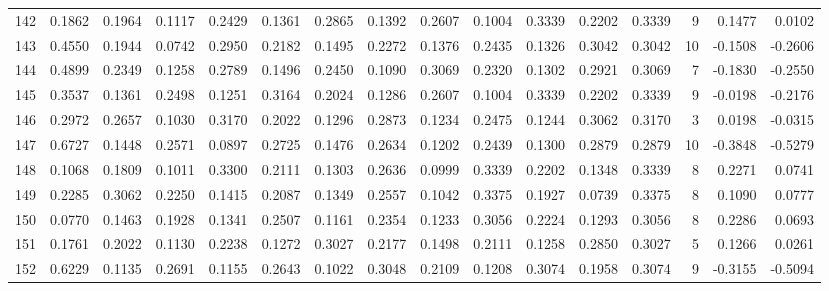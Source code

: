 \begin{tabular}{lrrrrrrrrrrrrrrr}
142 &      0.1862 &  0.1964 &  0.1117 &  0.2429 &  0.1361 &  0.2865 &  0.1392 &  0.2607 &  0.1004 &  0.3339 &   0.2202 &     0.3339 &      9 &                    0.1477 &                     0.0102 \\
143 &      0.4550 &  0.1944 &  0.0742 &  0.2950 &  0.2182 &  0.1495 &  0.2272 &  0.1376 &  0.2435 &  0.1326 &   0.3042 &     0.3042 &     10 &                   -0.1508 &                    -0.2606 \\
144 &      0.4899 &  0.2349 &  0.1258 &  0.2789 &  0.1496 &  0.2450 &  0.1090 &  0.3069 &  0.2320 &  0.1302 &   0.2921 &     0.3069 &      7 &                   -0.1830 &                    -0.2550 \\
145 &      0.3537 &  0.1361 &  0.2498 &  0.1251 &  0.3164 &  0.2024 &  0.1286 &  0.2607 &  0.1004 &  0.3339 &   0.2202 &     0.3339 &      9 &                   -0.0198 &                    -0.2176 \\
146 &      0.2972 &  0.2657 &  0.1030 &  0.3170 &  0.2022 &  0.1296 &  0.2873 &  0.1234 &  0.2475 &  0.1244 &   0.3062 &     0.3170 &      3 &                    0.0198 &                    -0.0315 \\
147 &      0.6727 &  0.1448 &  0.2571 &  0.0897 &  0.2725 &  0.1476 &  0.2634 &  0.1202 &  0.2439 &  0.1300 &   0.2879 &     0.2879 &     10 &                   -0.3848 &                    -0.5279 \\
148 &      0.1068 &  0.1809 &  0.1011 &  0.3300 &  0.2111 &  0.1303 &  0.2636 &  0.0999 &  0.3339 &  0.2202 &   0.1348 &     0.3339 &      8 &                    0.2271 &                     0.0741 \\
149 &      0.2285 &  0.3062 &  0.2250 &  0.1415 &  0.2087 &  0.1349 &  0.2557 &  0.1042 &  0.3375 &  0.1927 &   0.0739 &     0.3375 &      8 &                    0.1090 &                     0.0777 \\
150 &      0.0770 &  0.1463 &  0.1928 &  0.1341 &  0.2507 &  0.1161 &  0.2354 &  0.1233 &  0.3056 &  0.2224 &   0.1293 &     0.3056 &      8 &                    0.2286 &                     0.0693 \\
151 &      0.1761 &  0.2022 &  0.1130 &  0.2238 &  0.1272 &  0.3027 &  0.2177 &  0.1498 &  0.2111 &  0.1258 &   0.2850 &     0.3027 &      5 &                    0.1266 &                     0.0261 \\
152 &      0.6229 &  0.1135 &  0.2691 &  0.1155 &  0.2643 &  0.1022 &  0.3048 &  0.2109 &  0.1208 &  0.3074 &   0.1958 &     0.3074 &      9 &                   -0.3155 &                    -0.5094 \\

\end{tabular}
